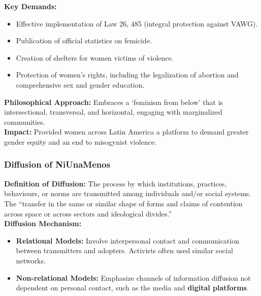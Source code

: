 \documentclass{article}
\begin{document}
    \noindent \textbf{Key Demands:}
    \begin{itemize}
        \item Effective implementation of Law 26, 485 (integral protection
        against VAWG).
        \item Publication of official statistics on femicide.
        \item Creation of shelters for women victims of violence.
        \item Protection of women's rights, including the legalization of
        abortion and comprehensive sex and gender education.
    \end{itemize}

    \noindent \textbf{Philosophical Approach:} Embraces a `feminism from
below' that is intersectional, transversal, and horizontal, engaging with
marginalized communities.\\

    \noindent \textbf{Impact:} Provided women across Latin America a
platform to demand greater gender equity and an end to misogynist violence.

    \subsubsection{Diffusion of NiUnaMenos}

    \noindent \textbf{Definition of Diffusion:} The process by which
institutions, practices, behaviours, or norms are transmitted among
individuals and/or social systems. The ``transfer in the same or similar
shape of forms and claims of contention across space or across sectors and
ideological divides.''\\

    \noindent \textbf{Diffusion Mechanism:}
    \begin{itemize}
        \item \textbf{Relational Models:} Involve interpersonal contact and
        communication between transmitters and adopters. Activists often
        used similar social networks.
        \item \textbf{Non-relational Models:} Emphasize channels of
        information diffusion not dependent on personal contact, such as the
        media and \textbf{digital platforms}.
    \end{itemize}
\end{document}
